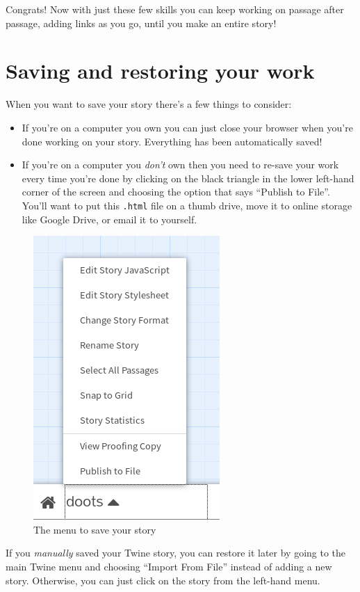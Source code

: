 \documentclass[a5paper,11pt]{article}
\begin{document}
Congrats! Now with just these few skills you can keep working on passage after passage, adding links as you go, until you make an entire story!
\section{Saving and restoring your work}
When you want to save your story there's a few things to consider:
\begin{itemize}
  \item If you're on a computer you own you can just close your browser when you're done working on your story. Everything has been automatically saved!
  \item If you're on a computer you \emph{don't} own then you need to re-save your work every time you're done by clicking on the black triangle in the lower left-hand corner of the screen and choosing the option that says ``Publish to File''. You'll want to put this \verb".html" file on a thumb drive, move it to online storage like Google Drive, or email it to yourself.
  \end{itemize}

  \begin{figure}[h]
    \caption{The menu to save your story}
    \includegraphics[width=0.6\linewidth]{SavingTwine}
    \centering
  \end{figure}
  
  If you \emph{manually} saved your Twine story, you can restore it later by going to the main Twine menu and choosing ``Import From File'' instead of adding a new story. Otherwise, you can just click on the story from the left-hand menu.
  \newpage
\end{document}
